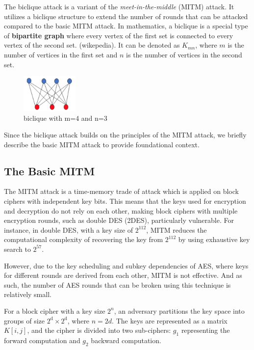 \documentclass{rapport}
\begin{document}
 

The biclique attack is a variant of the \emph{meet-in-the-middle} (MITM) attack. 
It utilizes a biclique structure to extend the number of rounds that can be attacked compared to the basic MITM attack. 
In mathematics, a biclique is a special type of \textbf{bipartite graph} where every vertex of the first set is connected to every vertex of the second set. (wikepedia). 
It can be denoted as \(K_{mn}\), where $m$ is the number of vertices in the first set and $n$ is the number of vertices in the second set. 

\begin{figure}[h]
    \centering
    \includegraphics[width=0.25\textwidth]{figures/1.jpg}
    \caption{biclique with m=4 and n=3}
    \label{fig:biclique with m=4 and n=3}
\end{figure}

Since the biclique attack builds on the principles of the MITM attack, we briefly describe the basic MITM attack to provide foundational context. 

\subsection{The Basic MITM}
The MITM attack is a time-memory trade of attack which is applied on block ciphers with independent key bits. This means that the keys used for encryption and decryption do not rely on each other, making block ciphers with multiple encryption rounds, such as double DES (2DES), particularly vulnerable. For instance, in double DES, with a key size of $2^{112}$, MITM reduces the computational complexity of recovering the key from $2^{112}$ by using exhaustive key search to $2^{57}$. 

However, due to the key scheduling and subkey dependencies of AES, where keys for different rounds are derived from each other, MITM is not effective. And as such, the number of AES rounds that can be broken using this technique is relatively small. 

For a block cipher with a key size $2^n$, an adversary partitions the key space into groups of size $2^{\text{d}} \times 2^{\text{d}}$, where \(n = 2d\). The keys are represented as a matrix \(K[i, j]\), and the cipher is divided into two sub-ciphers: $g_1$ representing the forward computation and $g_2$ backward computation. 
\end{document}

